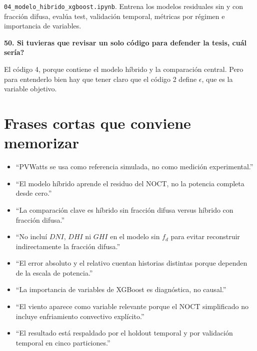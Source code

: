 \documentclass[11pt, letterpaper]{article}
\newcommand{\fd}{f_d}
\begin{document}
\texttt{04\_modelo\_hibrido\_xgboost.ipynb}. Entrena los modelos residuales sin y con fracci\'on difusa, eval\'ua test, validaci\'on temporal, m\'etricas por r\'egimen e importancia de variables.

\textbf{50. \textquestiondown Si tuvieras que revisar un solo c\'odigo para defender la tesis, cu\'al ser\'ia?}

El c\'odigo 4, porque contiene el modelo h\'ibrido y la comparaci\'on central. Pero para entenderlo bien hay que tener claro que el c\'odigo 2 define \(\epsilon\), que es la variable objetivo.

\section{Frases cortas que conviene memorizar}

\begin{itemize}
    \item ``PVWatts se usa como referencia simulada, no como medici\'on experimental.''
    \item ``El modelo h\'ibrido aprende el residuo del NOCT, no la potencia completa desde cero.''
    \item ``La comparaci\'on clave es h\'ibrido sin fracci\'on difusa versus h\'ibrido con fracci\'on difusa.''
    \item ``No inclu\'i \(DNI\), \(DHI\) ni \(GHI\) en el modelo sin \(\fd\) para evitar reconstruir indirectamente la fracci\'on difusa.''
    \item ``El error absoluto y el relativo cuentan historias distintas porque dependen de la escala de potencia.''
    \item ``La importancia de variables de XGBoost es diagn\'ostica, no causal.''
    \item ``El viento aparece como variable relevante porque el NOCT simplificado no incluye enfriamiento convectivo expl\'icito.''
    \item ``El resultado est\'a respaldado por el holdout temporal y por validaci\'on temporal en cinco particiones.''
\end{itemize}
\end{document}

